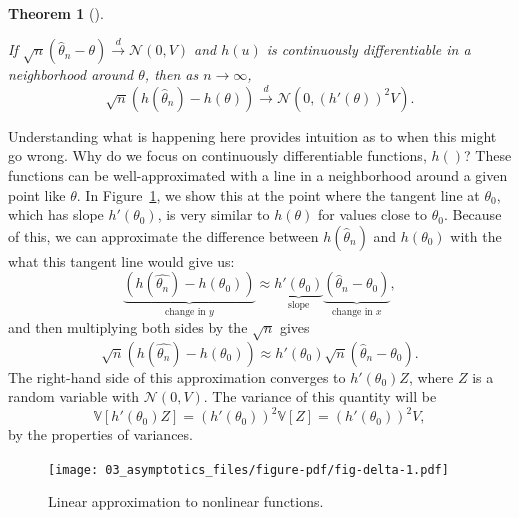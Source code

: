 \documentclass[
  letterpaper,
  DIV=11,
  numbers=noendperiod]{scrreprt}
\newcommand{\V}{\mathbb{V}}
\newcommand{\N}{\mathcal{N}}
\newcommand{\indist}{\overset{d}{\to}}
\theoremstyle{plain}
\newtheorem{theorem}{Theorem}[chapter]
\theoremstyle{definition}
\theoremstyle{definition}
\theoremstyle{remark}
\begin{document}
\begin{theorem}[]\protect\hypertarget{thm-delta-method}{}\label{thm-delta-method}

If \(\sqrt{n}\left(\widehat{\theta}_n - \theta\right) \indist \N(0, V)\)
and \(h(u)\) is continuously differentiable in a neighborhood around
\(\theta\), then as \(n\to\infty\), \[
\sqrt{n}\left(h(\widehat{\theta}_n) - h(\theta) \right) \indist \N(0, (h'(\theta))^2 V).
\]

\end{theorem}

Understanding what is happening here provides intuition as to when this
might go wrong. Why do we focus on continuously differentiable
functions, \(h()\)? These functions can be well-approximated with a line
in a neighborhood around a given point like \(\theta\). In
Figure~\ref{fig-delta}, we show this at the point where the tangent line
at \(\theta_0\), which has slope \(h'(\theta_0)\), is very similar to
\(h(\theta)\) for values close to \(\theta_0\). Because of this, we can
approximate the difference between \(h(\widehat{\theta}_n)\) and
\(h(\theta_0)\) with the what this tangent line would give us: \[
\underbrace{\left(h(\widehat{\theta_n}) - h(\theta_0)\right)}_{\text{change in } y} \approx \underbrace{h'(\theta_0)}_{\text{slope}} \underbrace{\left(\widehat{\theta}_n - \theta_0\right)}_{\text{change in } x},
\] and then multiplying both sides by the \(\sqrt{n}\) gives \[
\sqrt{n}\left(h(\widehat{\theta_n}) - h(\theta_0)\right) \approx h'(\theta_0)\sqrt{n}\left(\widehat{\theta}_n - \theta_0\right). 
\] The right-hand side of this approximation converges to
\(h'(\theta_0)Z\), where \(Z\) is a random variable with \(\N(0, V)\).
The variance of this quantity will be \[
\V[h'(\theta_0)Z] = (h'(\theta_0))^2\V[Z] = (h'(\theta_0))^2V,
\] by the properties of variances.

\begin{figure}[th]

{\centering \texttt{[image: 03\_asymptotics\_files/figure-pdf/fig-delta-1.pdf]}

}

\caption{\label{fig-delta}Linear approximation to nonlinear functions.}

\end{figure}
\end{document}
